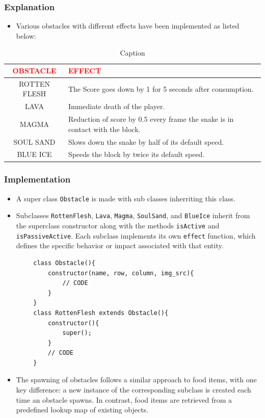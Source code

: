 \documentclass{article}
\begin{document}
    \subsubsection{Explanation}
    \begin{itemize}
        \item Various obstacles with different effects have been implemented as listed below:
    \end{itemize}
    \begin{table}[H]
        \centering
        \begin{tabular}{|c|l|}
            \hline
             \textcolor{red}{OBSTACLE}&\textcolor{red}{EFFECT}  \\
             \hline
             ROTTEN FLESH& The Score goes down by 1 for 5 seconds after consumption. \\
             LAVA & Immediate death of the player.\\
             MAGMA & Reduction of score by 0.5 every frame the snake is in contact with the block.\\
             SOUL SAND & Slows down the snake by half of its default speed. \\
             BLUE ICE & Speeds the block by twice its default speed.\\
             \hline
        \end{tabular}
        \caption{Caption}
        \label{tab:Obstacles}
    \end{table}
    \subsubsection{Implementation}
    \begin{itemize}
        \item A super class \texttt{Obstacle} is made with sub classes inherriting this class.
        \item Subclasses \texttt{RottenFlesh}, \texttt{Lava}, \texttt{Magma}, \texttt{SoulSand}, and \texttt{BlueIce} inherit from the superclass constructor along with the methods \texttt{isActive} and \texttt{isPassiveActive}. Each subclass implements its own \texttt{effect} function, which defines the specific behavior or impact associated with that entity.
    \end{itemize}
    \begin{verbatim}
        class Obstacle(){
            constructor(name, row, column, img_src){
                // CODE
            }
        }
        class RottenFlesh extends Obstacle(){
            constructor(){
                super();
            }
            // CODE
        }
    \end{verbatim}
    \begin{itemize}
        \item The spawning of obstacles follows a similar approach to food items, with one key difference: a new instance of the corresponding subclass is created each time an obstacle spawns. In contrast, food items are retrieved from a predefined lookup map of existing objects.
    \end{itemize}
\end{document}
